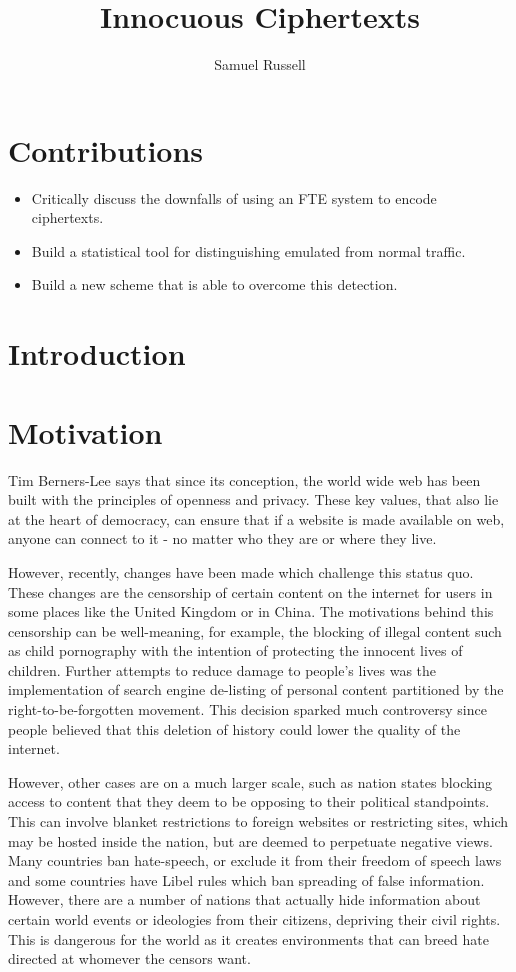 \documentclass[10pt,a4paper]{article}
\author{Samuel Russell}
\title{Innocuous Ciphertexts}
\begin{document}
\maketitle

\section{Contributions}

\begin{itemize}
\item Critically discuss the downfalls of using an FTE system to encode ciphertexts.
\item Build a statistical tool for distinguishing emulated from normal traffic.
\item Build a new scheme that is able to overcome this detection.
\end{itemize}

\pagebreak
\section{Introduction}

\pagebreak
\section{Motivation}

Tim Berners-Lee says\cite{gard} that since its conception, the world wide web has been built with the principles of openness and privacy. These key values, that also lie at the heart of democracy, can ensure that if a website is made available on web, anyone can connect to it - no matter who they are or where they live. 

However, recently, changes have been made which challenge this status quo. These changes are the censorship of certain content on the internet for users in some places like the United Kingdom or in China. The motivations behind this censorship can be well-meaning, for example, the blocking of illegal content such as child pornography with the intention of protecting the innocent lives of children. Further attempts to reduce damage to people's lives was the implementation of search engine de-listing of personal content partitioned by the right-to-be-forgotten movement\cite{rtbf}. This decision sparked much controversy since people believed that this deletion of history could lower the quality of the internet. 

However, other cases are on a much larger scale, such as nation states blocking access to content that they deem to be opposing to their political standpoints. This can involve blanket restrictions to foreign websites or restricting sites, which may be hosted inside the nation, but are deemed to perpetuate negative views. Many countries ban hate-speech, or exclude it from their freedom of speech laws\cite{hate} and some countries have Libel rules\cite{libel} which ban spreading of false information. However, there are a number of nations that actually hide information about certain world events or ideologies from their citizens, depriving their civil rights\cite{chincensor}. This is dangerous for the world as it creates environments that can breed hate directed at whomever the censors want.
\end{document}
